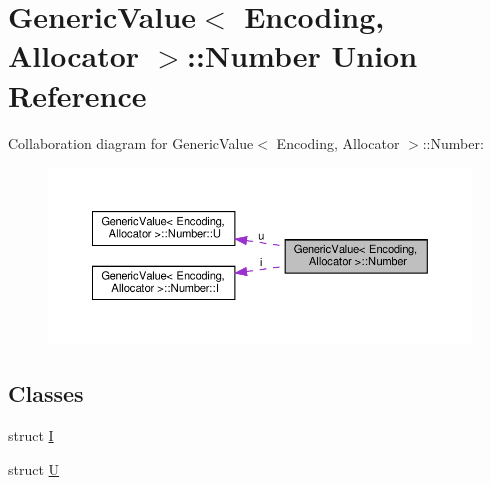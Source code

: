 \hypertarget{unionGenericValue_1_1Number}{}\section{Generic\+Value$<$ Encoding, Allocator $>$\+:\+:Number Union Reference}
\label{unionGenericValue_1_1Number}


Collaboration diagram for Generic\+Value$<$ Encoding, Allocator $>$\+:\+:Number\+:
\nopagebreak
\begin{figure}[H]
\begin{center}
\leavevmode
\includegraphics[width=350pt]{unionGenericValue_1_1Number__coll__graph}
\end{center}
\end{figure}
\subsection*{Classes}
\begin{DoxyCompactItemize}
\item 
struct \hyperlink{structGenericValue_1_1Number_1_1I}{I}
\item 
struct \hyperlink{structGenericValue_1_1Number_1_1U}{U}
\end{DoxyCompactItemize}
